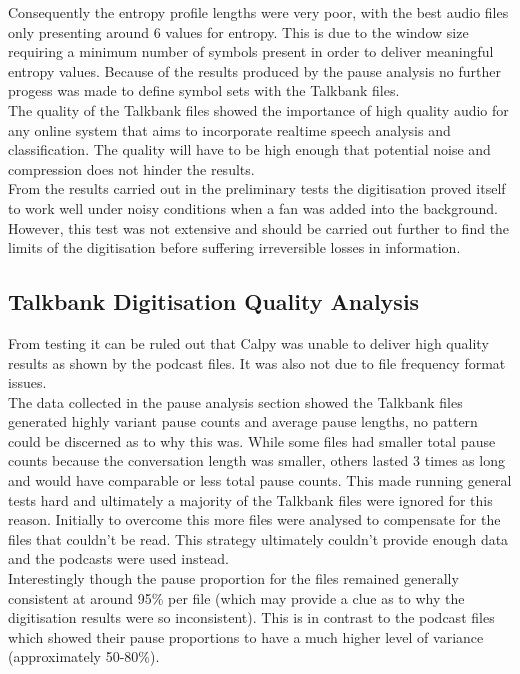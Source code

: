 Consequently the entropy profile lengths were very poor, with the best audio files only presenting around 6 values for entropy. This is due to the window size requiring a minimum number of symbols present in order to deliver meaningful entropy values. Because of the results produced by the pause analysis no further progess was made to define symbol sets with the Talkbank files. \\

The quality of the Talkbank files showed the importance of high quality audio for any online system that aims to incorporate realtime speech analysis and classification. The quality will have to be high enough that potential noise and compression does not hinder the results. \\

From the results carried out in the preliminary tests the digitisation proved itself to work well under noisy conditions when a fan was added into the background. However, this test was not extensive and should be carried out further to find the limits of the digitisation before suffering irreversible losses in information. \\

\subsection{Talkbank Digitisation Quality Analysis}
From testing it can be ruled out that Calpy was unable to deliver high quality results as shown by the podcast files. It was also not due to file frequency format issues. \\

The data collected in the pause analysis section showed the Talkbank files generated highly variant pause counts and average pause lengths, no pattern could be discerned as to why this was. While some files had smaller total pause counts because the conversation length was smaller, others lasted 3 times as long and would have comparable or less total pause counts. This made running general tests hard and ultimately a majority of the Talkbank files were ignored for this reason. Initially to overcome this more files were analysed to compensate for the files that couldn't be read. This strategy ultimately couldn't provide enough data and the podcasts were used instead. \\

Interestingly though the pause proportion for the files remained generally consistent at around 95\% per file (which may provide a clue as to why the digitisation results were so inconsistent). This is in contrast to the podcast files which showed their pause proportions to have a much higher level of variance (approximately 50-80\%). \\

